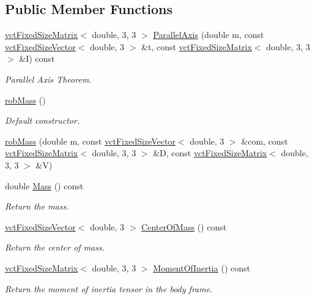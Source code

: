 \subsection*{Public Member Functions}
\begin{DoxyCompactItemize}
\item 
\hyperlink{classvct_fixed_size_matrix}{vct\+Fixed\+Size\+Matrix}$<$ double, 3, 3 $>$ \hyperlink{classrob_mass_a331a838101e66963b804b79ec03a7590}{Parallel\+Axis} (double m, const \hyperlink{classvct_fixed_size_vector}{vct\+Fixed\+Size\+Vector}$<$ double, 3 $>$ \&t, const \hyperlink{classvct_fixed_size_matrix}{vct\+Fixed\+Size\+Matrix}$<$ double, 3, 3 $>$ \&I) const 
\begin{DoxyCompactList}\small\item\em Parallel Axis Theorem. \end{DoxyCompactList}\item 
\hyperlink{classrob_mass_a2a6672b130620ef278f190db9ea8f916}{rob\+Mass} ()
\begin{DoxyCompactList}\small\item\em Default constructor. \end{DoxyCompactList}\item 
\hyperlink{classrob_mass_aecd46b1f11cf00af8f238a07018ecce1}{rob\+Mass} (double m, const \hyperlink{classvct_fixed_size_vector}{vct\+Fixed\+Size\+Vector}$<$ double, 3 $>$ \&com, const \hyperlink{classvct_fixed_size_matrix}{vct\+Fixed\+Size\+Matrix}$<$ double, 3, 3 $>$ \&D, const \hyperlink{classvct_fixed_size_matrix}{vct\+Fixed\+Size\+Matrix}$<$ double, 3, 3 $>$ \&V)
\item 
double \hyperlink{classrob_mass_a02b79738d557ca3959e047ce9e72d028}{Mass} () const 
\begin{DoxyCompactList}\small\item\em Return the mass. \end{DoxyCompactList}\item 
\hyperlink{classvct_fixed_size_vector}{vct\+Fixed\+Size\+Vector}$<$ double, 3 $>$ \hyperlink{classrob_mass_a96ba906f78fa4b0fbf3418b2c58af666}{Center\+Of\+Mass} () const 
\begin{DoxyCompactList}\small\item\em Return the center of mass. \end{DoxyCompactList}\item 
\hyperlink{classvct_fixed_size_matrix}{vct\+Fixed\+Size\+Matrix}$<$ double, 3, 3 $>$ \hyperlink{classrob_mass_af2696ac482e6385f11e7a39be637a57d}{Moment\+Of\+Inertia} () const 
\begin{DoxyCompactList}\small\item\em Return the moment of inertia tensor in the body frame. \end{DoxyCompactList}\item 

\end{DoxyCompactItemize}
